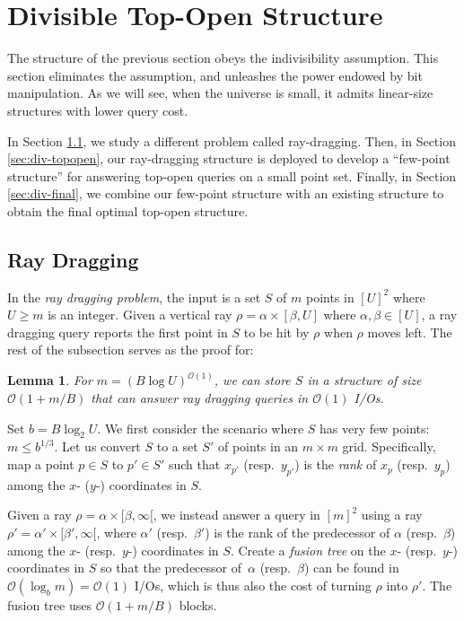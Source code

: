 \documentclass{sig-alternate}
\newtheorem{lemma}{Lemma}
\newcommand{\bigO}{\mathcal{O}}
\renewcommand{\(}{\left(}
\renewcommand{\)}{\right)}
\begin{document}
\section{Divisible Top-Open Structure} \label{sec:div}


The structure of the previous section obeys the indivisibility assumption. This section
eliminates the assumption, and unleashes the power endowed by bit manipulation.
As we will see, when the universe is small, it admits linear-size structures
with lower query cost.

In Section \ref{sec:div-ray}, we study a different problem called ray-dragging. Then, in Section \ref{sec:div-topopen}, our ray-dragging structure is deployed to develop a ``few-point structure'' for answering top-open queries on a small point set. Finally, in Section \ref{sec:div-final}, we combine our few-point structure with an existing structure \cite{BT11} to obtain the final optimal top-open structure.

\subsection{Ray Dragging} \label{sec:div-ray}


In the {\em ray dragging problem}, the input is a set $S$ of $m$ points in $[U]^2$ where $U \ge m$ is an integer. Given a vertical ray $\rho = \alpha \times [\beta, U]$ where $\alpha, \beta \in [U]$, a ray dragging query reports the first point in $S$ to be hit by $\rho$ when $\rho$ moves left. The rest of the subsection serves as the proof for:

\begin{lemma} \label{lmm:div-ray}
  For $m = (B \log U)^{\bigO(1)}$, we can store $S$ in a structure of size
  $\bigO(1 + m/B)$ that can answer ray dragging queries in $\bigO(1)$ I/Os.
\end{lemma}



 Set $b = B \log_2 U$. We first consider the scenario where $S$ has very few points: $m \le b^{1/3}$. Let us convert $S$ to a set $S'$ of points in an $m \times m$ grid. Specifically, map a point $p \in S$ to $p' \in S'$ such that $x_{p'}$ (resp.\ $y_{p'}$) is the {\em rank} of $x_{p}$ (resp.\ $y_p$) among the $x$- ($y$-) coordinates in $S$.

Given a ray $\rho = \alpha \times [\beta, \infty[$, we instead answer a query in $[m]^2$ using a ray $\rho' = \alpha' \times [\beta', \infty[$, where $\alpha'$ (resp.\ $\beta'$) is the rank of the predecessor of $\alpha$ (resp.\ $\beta$) among the $x$- (resp.\ $y$-) coordinates in $S$. Create a {\em fusion tree} \cite{FW93, LP12} on the $x$- (resp.\ $y$-) coordinates in $S$ so that the predecessor of~$\alpha$ (resp.\ $\beta$) can be found in $\bigO(\log_b m) = \bigO(1)$ I/Os, which is thus also the cost of turning $\rho$ into $\rho'$. The fusion tree uses $\bigO(1 + m/B)$ blocks.
\end{document}
